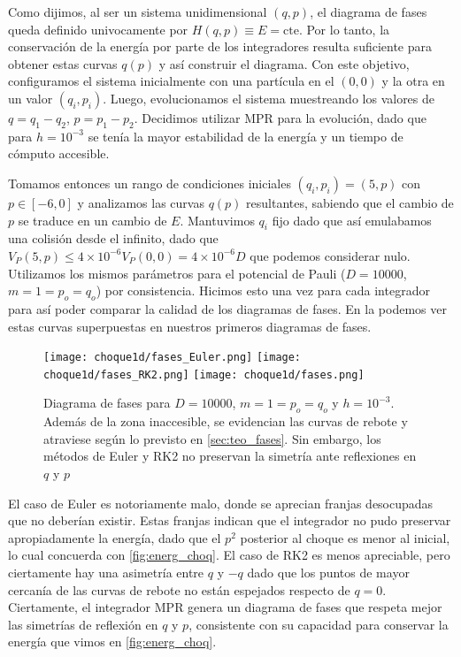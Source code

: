 Como dijimos, al ser un sistema unidimensional $(q,p)$, el diagrama de fases queda definido univocamente por $H(q,p)\equiv E = \text{cte}$.
Por lo tanto, la conservación de la energía por parte de los integradores resulta suficiente para obtener estas curvas $q(p)$ y así construir el diagrama.
Con este objetivo, configuramos el sistema inicialmente con una partícula en el $(0,0)$ y la otra en un valor $(q_i, p_i)$.
Luego, evolucionamos el sistema muestreando los valores de $q = q_1 - q_2$, $p = p_1 - p_2$.
Decidimos utilizar MPR para la evolución, dado que para $h=10^{-3}$ se tenía la mayor estabilidad de la energía y un tiempo de cómputo accesible.

Tomamos entonces un rango de condiciones iniciales $(q_i,p_i)=(5,p)$ con $p\in [-6,0]$ y analizamos las curvas $q(p)$ resultantes, sabiendo que el cambio de $p$ se traduce en un cambio de $E$.
Mantuvimos $q_i$ fijo dado que así emulabamos una colisión desde el infinito, dado que $V_P(5,p)\leq 4\times10^{-6}V_P(0,0) = 4\times10^{-6}D$ que podemos considerar nulo.
Utilizamos los mismos parámetros para el potencial de Pauli ($D=10000$, $m=1=p_o=q_o$) por consistencia.
Hicimos esto una vez para cada integrador para así poder comparar la calidad de los diagramas de fases.
En la  podemos ver estas curvas superpuestas en nuestros primeros diagramas de fases.

\begin{figure}[H]
	\centering	%
	\texttt{[image: choque1d/fases\_Euler.png]}
	\texttt{[image: choque1d/fases\_RK2.png]}
	\texttt{[image: choque1d/fases.png]}
	\caption{Diagrama de fases para $D=10000$, $m=1=p_o=q_o$ y $h=10^{-3}$. Además de la zona inaccesible, se evidencian las curvas de rebote y atraviese según lo previsto en \ref{sec:teo_fases}.
	Sin embargo, los métodos de Euler y RK2 no preservan la simetría ante reflexiones en $q$ y $p$}
	\label{fig:ej_diag_fases}
\end{figure}

El caso de Euler es notoriamente malo, donde se aprecian franjas desocupadas que no deberían existir.
Estas franjas indican que el integrador no pudo preservar apropiadamente la energía, dado que el $p^2$ posterior al choque es menor al inicial, lo cual concuerda con \ref{fig:energ_choq}.
El caso de RK2 es menos apreciable, pero ciertamente hay una asimetría entre $q$ y $-q$ dado que los puntos de mayor cercanía de las curvas de rebote no están espejados respecto de $q=0$.
Ciertamente, el integrador MPR genera un diagrama de fases que respeta mejor las simetrías de reflexión en $q$ y $p$, consistente con su capacidad para conservar la energía que vimos en \ref{fig:energ_choq}.

